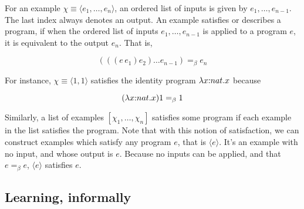 For an example $\chi \equiv \langle e_1,\dots,e_n\rangle$, an ordered list of inputs is given by $e_1,\dots,e_{n-1}$. The last index always denotes an output. An example satisfies or describes a program, if when the ordered list of inputs $e_1,\dots,e_{n-1}$ is applied to a program $e$, it is equivalent to the output $e_n$. That is,\vspace{-1.0em}
\begin{singlespace}
$$(((e\,e_1)e_2)\dots e_{n-1}) =_\beta e_n$$
\end{singlespace}
For instance, $\chi \equiv \langle 1,1\rangle$ satisfies the identity program $\lambda x{:}nat.x$ because \vspace{-1.0em}
\begin{singlespace}
$$(\lambda x{:}nat.x)1 =_\beta 1$$
\end{singlespace}
Similarly, a list of examples $[\chi_1,\dots,\chi_n]$ satisfies some program if each example in the list satisfies the program. Note that with this notion of satisfaction, we can construct examples which satisfy any program $e$, that is $\langle e\rangle$. It's an example with no input, and whose output is $e$. Because no inputs can be applied, and that $e =_\beta e$, $\langle e\rangle$ satisfies $e$.
\subsection{Learning, informally}

